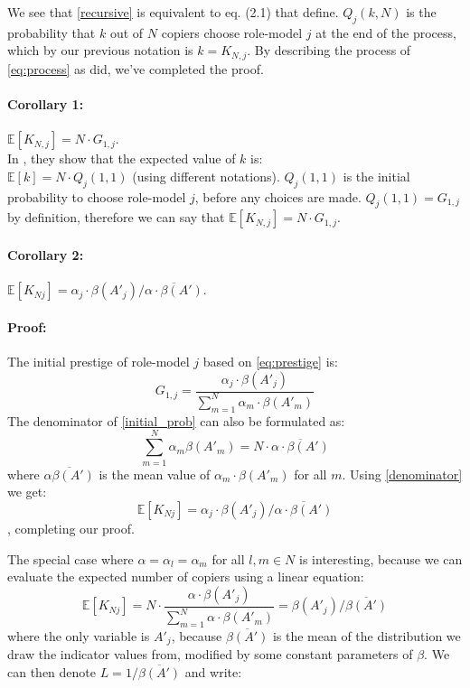 \documentclass[11pt]{article}
\begin{document}
We see that \cref{recursive} is equivalent to eq. (2.1) that \citet{GBD} define.
$Q_j(k,N)$ is the probability that $k$ out of $N$ copiers choose role-model $j$ at the end of the process, which by our previous notation is $k=K_{N,j}$.
By describing the process of \cref{eq:process} as \citep{GBD} did, we've completed the proof.

\paragraph{Corollary 1: } $\mathbb{E}[K_{N,j}] = N \cdot G_{1,j}$.\\
In \citep[equation 2.3]{GBD}, they show that the expected value of $k$ is: \\
$\mathbb{E}[k] = N \cdot Q_j(1,1)$ (using different notations).
$Q_j(1,1)$ is the initial probability to choose role-model $j$, before any choices are made.
$Q_j(1,1) = G_{1,j}$ by definition, therefore we can say that $\mathbb{E}[K_{N,j}]=N \cdot G_{1,j}$.\\

\paragraph{Corollary 2: } $\mathbb{E}[K_{Nj}] = \alpha_j \cdot \beta(A'_j) / \overline{\alpha \cdot \beta(A')}$.
\paragraph{Proof: } The initial prestige of role-model $j$ based on \cref{eq:prestige} is:
\begin{equation}\label{initial_prob}
G_{1,j} = \frac{\alpha_j\cdot\beta(A'_j)}{\sum\limits_{m=1}^{N}\alpha_m\cdot\beta(A'_m)}
\end{equation}
The denominator of \cref{initial_prob} can also be formulated as:
\begin{equation}\label{denominator}
 \sum\limits_{m=1}^{N}\alpha_m\beta(A'_m) = N \cdot \overline{\alpha \cdot \beta(A')}
\end{equation}
where $\overline{\alpha\beta(A')}$ is the mean value of $\alpha_m\cdot\beta(A'_m)$ for all $m$.
Using \cref{denominator} we get:
\begin{equation}
\mathbb{E}[K_{Nj}] = \alpha_j \cdot \beta(A'_j) \bigg/ \overline{\alpha \cdot \beta(A')}
\end{equation},
completing our proof.

The special case where $\alpha = \alpha_l=\alpha_m$ for all $l,m \in N$ is interesting, because we can evaluate the expected number of copiers using a linear equation:
\begin{equation}
\mathbb{E}[K_{Nj}]= N\cdot\frac{\alpha\cdot\beta(A'_j)}{\sum\limits_{m=1}^{N}\alpha\cdot\beta(A'_m)} =\beta(A'_j) \bigg/ \overline{\beta(A')}
\end{equation}
where the only variable is $A'_j$, because $\overline{\beta(A')}$ is the mean of the distribution we draw the indicator values from, modified by some constant parameters of $\beta$.
We can then denote $L = 1/\overline{\beta(A')}$ and write:
\end{document}
